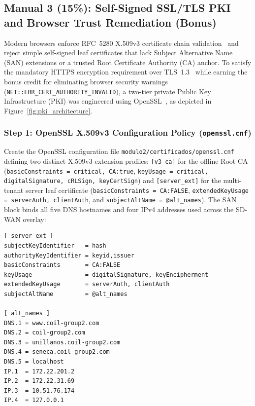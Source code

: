\subsection{Manual 3 (15\%): Self-Signed SSL/TLS PKI and Browser Trust Remediation (Bonus)}
\label{subsec:manual3_pki}

Modern browsers enforce RFC~5280 X.509v3 certificate chain validation~\cite{rfc5280} and reject simple self-signed leaf certificates that lack Subject Alternative Name (SAN) extensions or a trusted Root Certificate Authority (CA) anchor. To satisfy the mandatory HTTPS encryption requirement over TLS~1.3~\cite{rfc8446} while earning the bonus credit for eliminating browser security warnings (\texttt{NET::ERR\_CERT\_AUTHORITY\_INVALID}), a two-tier private Public Key Infrastructure (PKI) was engineered using OpenSSL~\cite{openssl2024}, as depicted in Figure~\ref{fig:pki_architecture}.



\subsubsection{Step 1: OpenSSL X.509v3 Configuration Policy (\texttt{openssl.cnf})}
Create the OpenSSL configuration file \texttt{modulo2/certificados/openssl.cnf} defining two distinct X.509v3 extension profiles: \texttt{[v3\_ca]} for the offline Root CA (\texttt{basicConstraints = critical, CA:true}, \texttt{keyUsage = critical, digitalSignature, cRLSign, keyCertSign}) and \texttt{[server\_ext]} for the multi-tenant server leaf certificate (\texttt{basicConstraints = CA:FALSE}, \texttt{extendedKeyUsage = serverAuth, clientAuth}, and \texttt{subjectAltName = @alt\_names}). The SAN block binds all five DNS hostnames and four IPv4 addresses used across the SD-WAN overlay:

\begin{lstlisting}[caption={X.509v3 Subject Alternative Name declaration in \texttt{openssl.cnf}.},label={lst:manual3_san}]
[ server_ext ]
subjectKeyIdentifier   = hash
authorityKeyIdentifier = keyid,issuer
basicConstraints       = CA:FALSE
keyUsage               = digitalSignature, keyEncipherment
extendedKeyUsage       = serverAuth, clientAuth
subjectAltName         = @alt_names

[ alt_names ]
DNS.1 = www.coil-group2.com
DNS.2 = coil-group2.com
DNS.3 = unillanos.coil-group2.com
DNS.4 = seneca.coil-group2.com
DNS.5 = localhost
IP.1  = 172.22.201.2
IP.2  = 172.22.31.69
IP.3  = 10.51.76.174
IP.4  = 127.0.0.1
\end{lstlisting}

